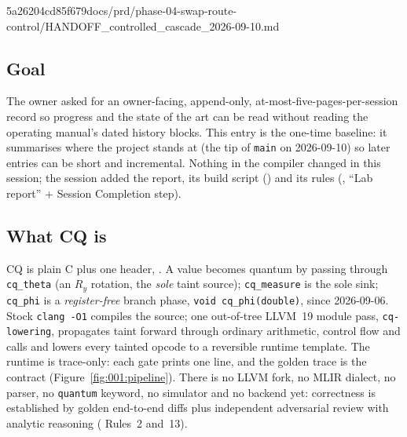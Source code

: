 %
  {5a26204}{cd85f679}{docs/prd/phase-04-swap-route-control/HANDOFF\_controlled\_cascade\_2026-09-10.md}

\subsection*{Goal}
The owner asked for an owner-facing, append-only, at-most-five-pages-per-session record so
progress and the state of the art can be read without reading the operating manual's dated
history blocks. This entry is the one-time baseline: it summarises where the project stands at
 (the tip of \texttt{main} on 2026-09-10) so later entries can be short and
incremental. Nothing in the compiler changed in this session; the session added the report,
its build script () and its rules (,
 ``Lab report'' + Session Completion step).

\subsection*{What CQ is}
CQ is plain C plus one header, . A value becomes quantum by passing through
\texttt{cq\_theta} (an \(R_y\) rotation, the \emph{sole} taint source); \texttt{cq\_measure} is the
sole sink; \texttt{cq\_phi} is a \emph{register-free} branch phase, \texttt{void cq\_phi(double)},
since 2026-09-06. Stock \texttt{clang -O1} compiles the source; one out-of-tree LLVM~19 module pass,
\texttt{cq-lowering}, propagates taint forward through ordinary arithmetic, control flow and calls
and lowers every tainted opcode to a reversible runtime template. The runtime is trace-only: each
gate prints one line, and the golden trace is the contract (Figure~\ref{fig:001:pipeline}). There is
no LLVM fork, no MLIR dialect, no parser, no \texttt{quantum} keyword, no simulator and no backend
yet: correctness is established by golden end-to-end diffs plus independent adversarial review
with analytic reasoning ( Rules~2 and~13).

